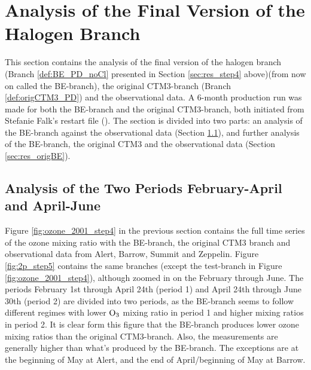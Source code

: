 

\clearpage

\section{Analysis of the Final Version of the Halogen Branch}\label{sec:res_final_Version}

This section contains the analysis of the final version of the halogen branch (Branch \ref{def:BE_PD_noCl} presented in Section \ref{sec:res_step4} above)(from now on called the BE-branch), the original CTM3-branch (Branch \ref{def:origCTM3_PD}) and the observational data. A 6-month production run was made for both the BE-branch and the original CTM3-branch, both initiated from Stefanie Falk's restart file (\cite{StefaniePersonal}). The section is divided into two parts: an analysis of the BE-branch against the observational data (Section \ref{sec:res_twoPeriods}), and further analysis of the BE-branch, the original CTM3 and the observational data (Section \ref{sec:res_origBE}).

\subsection{Analysis of the Two Periods February-April and April-June}\label{sec:res_twoPeriods}

Figure \ref{fig:ozone_2001_step4} in the previous section contains the full time series of the ozone mixing ratio with the BE-branch, the original CTM3 branch and observational data from Alert, Barrow, Summit and Zeppelin. Figure \ref{fig:2p_step5} contains the same branches (except the test-branch in Figure \ref{fig:ozone_2001_step4}), although zoomed in on the February through June. The periods February 1st through April 24th (period 1) and April 24th through June 30th (period 2) are divided into two periods, as the BE-branch seems to follow different regimes with lower $\mathrm{O_3}$ mixing ratio in period 1 and higher mixing ratios in period 2. It is clear form this figure that the BE-branch produces lower ozone mixing ratios than the original CTM3-branch. Also, the measurements are generally higher than what's produced by the BE-branch. The exceptions are at the beginning of May at Alert,  and the end of April/beginning of May at Barrow.

